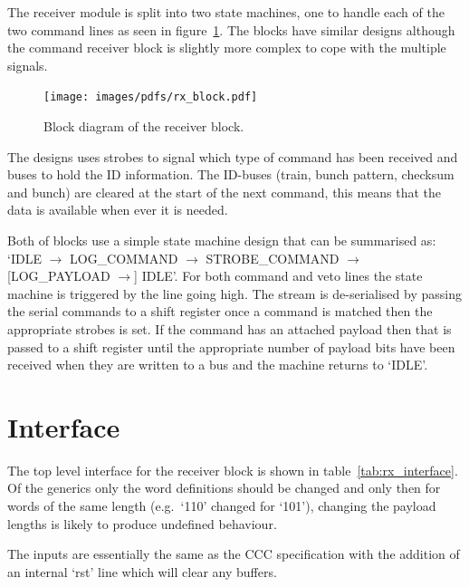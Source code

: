 \documentclass[]{report}
\begin{document}
    The receiver module is split into two state machines, one to handle each of the two command lines as seen in figure~\ref{fig:rx_block}. The blocks have similar designs although the command receiver block is slightly more complex to cope with the multiple signals. 
    \begin{figure}[htbp] 
        \centering
        \texttt{[image: images/pdfs/rx\_block.pdf]}
        \caption{Block diagram of the receiver block.}
        \label{fig:rx_block}
    \end{figure}
  
    The designs uses strobes to signal which type of command has been received and buses to hold the ID information. The ID-buses (train, bunch pattern, checksum and bunch) are cleared at the start of the next command, this means that the data is available when ever it is needed.
  
    Both of blocks use a simple state machine design that can be summarised as: `IDLE \( \rightarrow \) LOG\_COMMAND \( \rightarrow \) STROBE\_COMMAND \( \rightarrow \) [LOG\_PAYLOAD \( \rightarrow \)] IDLE'. For both command and veto lines the state machine is triggered by the line going high. The stream is de-serialised by passing the serial commands to a shift register once a command is matched then the appropriate strobes is set. If the command has an attached payload then that is passed to a shift register until the appropriate number of payload bits have been received when they are written to a bus and the machine returns to `IDLE'.
    \section{Interface} %
    \label{sub:rx_interface}
    The top level interface for the receiver block is shown in table~\ref{tab:rx_interface}. Of the generics only the word definitions should be changed and only then for words of the same length (e.g.\ `110' changed for `101'), changing the payload lengths is likely to produce undefined behaviour.
    
    The inputs are essentially the same as the CCC specification with the addition of an internal `rst' line which will clear any buffers.
    
\end{document}
